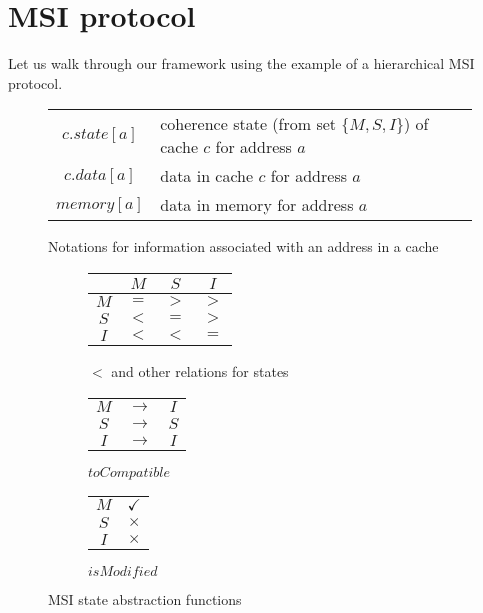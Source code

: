 \section{MSI protocol}
\label{sec:msi}

Let us walk through our framework using the example of a hierarchical MSI
protocol.


\begin{figure}
\begin{tabularx}{\linewidth}{|cX|}
\hline
$c.state[a]$ & coherence state (from set $\{M, S, I\}$) of cache $c$ for address $a$\\
$c.data[a]$ & data in cache $c$ for address $a$\\
$memory[a]$ & data in memory for address $a$\\
\hline
\end{tabularx}
\caption{Notations for information associated with an address in a cache}
\label{notation}
\end{figure}

\begin{figure}
\begin{subfigure}{.43\linewidth}
\centering
\begin{tabular}{|c|ccc|}
\hline
& $M$ & $S$ & $I$\\
\hline
$M$ & $=$ & $>$ & $>$\\
$S$ & $<$ & $=$ & $>$\\
$I$ & $<$ & $<$ & $=$\\
\hline
\end{tabular}
\caption{$<$ and other relations for states}
\label{msi<}
\end{subfigure}
\begin{subfigure}{.31\linewidth}
\centering
\begin{tabular}{|ccc|}
\hline
$M$ & $\rightarrow$ & $I$\\
$S$ & $\rightarrow$ & $S$\\
$I$ & $\rightarrow$ & $I$\\
\hline
\end{tabular}
\caption{$toCompatible$}
\label{toCompat}
\end{subfigure}
\begin{subfigure}{.22\linewidth}
\centering
\begin{tabular}{|c|c|}
\hline
$M$ & $\checkmark$\\
$S$ & $\times$\\
$I$ & $\times$\\
\hline
\end{tabular}
\caption{$isModified$}
\label{isModified}
\end{subfigure}
\caption{MSI state abstraction functions}
\label{funcs}
\end{figure}

